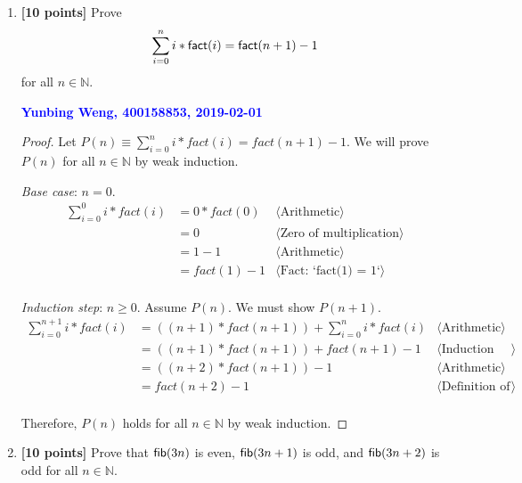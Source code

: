 \documentclass[11pt,fleqn]{article}
\newcommand{\mname}[1]{\mbox{\sf #1}}
\newcommand{\pnote}[1]{{\langle \text{#1} \rangle}}
\begin{document}
\begin{enumerate}

  \item \textbf{[10 points]} Prove \[\sum^{n}_{i = 0} i *
    \mname{fact}(i) = \mname{fact}(n+1) - 1\] for all $n \in
    \mathbb{N}$.

  \bigskip

  \textcolor{blue}{\textbf{Yunbing Weng, 400158853, 2019-02-01}}
  
  \begin{proof}
  	Let $P(n) \equiv \sum^{n}_{i=0}i*fact(i) = fact(n+1) - 1$.  We will prove $P(n)$
  	for all $n \in \mathbb{N}$ by weak induction.
  	
  	\medskip
  	
  	\emph{Base case}: $n = 0$.
  	\begin{align*}
  	\sum_{i=0}^{0} i * fact(i)
  	&= 0 * fact(0) & \pnote{Arithmetic}\\
  	&= 0           &  \pnote{Zero of multiplication}\\
	&= 1 - 1      &   \pnote{Arithmetic}\\ 
           &= fact(1) - 1 & \pnote{Fact: `fact(1) = 1`}\\
  	\end{align*}
\medskip

\emph{Induction step}: $n \ge 0$. Assume $P(n)$. We must show $P(n + 1)$.
\begin{align*}
  \sum_{i=0}^{n+1} i * fact(i)
  	&= ((n + 1) * fact(n+1)) + \sum_{i=0}^{n} i * fact(i) & \pnote{Arithmetic}\\
	&= ((n+1) * fact(n+1)) + fact(n+1) - 1 & \pnote{Induction Hypothesis}\\
	&= ((n+2) * fact(n+1)) - 1 & \pnote{Arithmetic}\\
	&= fact(n+2) - 1 & \pnote{Definition of fact(n+2)}\\
\end{align*}

\medskip

Therefore, $P(n)$ holds for all $n \in \mathbb{N}$ by weak induction.

 \end{proof}

  \bigskip

  \item \textbf{[10 points]} Prove that $\mname{fib}(3n)$ is even,
    $\mname{fib}(3n+1)$ is odd, and $\mname{fib}(3n+2)$ is odd for
    all $n \in \mathbb{N}$.

  \bigskip


\end{enumerate}
\end{document}
